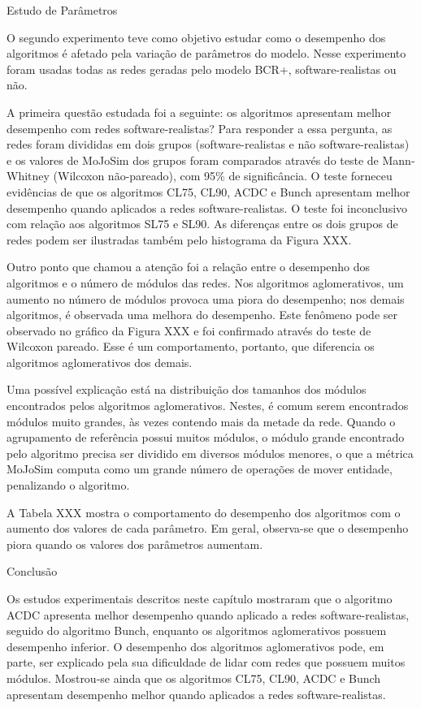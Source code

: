 \begin{section}{Estudo de Parâmetros}

O segundo experimento teve como objetivo estudar como o desempenho dos algoritmos é afetado pela variação de parâmetros do modelo. Nesse experimento foram usadas todas as redes geradas pelo modelo BCR+, software-realistas ou não.

A primeira questão estudada foi a seguinte: os algoritmos apresentam melhor desempenho com redes software-realistas? Para responder a essa pergunta, as redes foram divididas em dois grupos (software-realistas e não software-realistas) e os valores de MoJoSim dos grupos foram comparados através do teste de Mann-Whitney (Wilcoxon não-pareado), com 95\% de significância. O teste forneceu evidências de que os algoritmos CL75, CL90, ACDC e Bunch apresentam melhor desempenho quando aplicados a redes software-realistas. O teste foi inconclusivo com relação aos algoritmos SL75 e SL90. As diferenças entre os dois grupos de redes podem ser ilustradas também pelo histograma da Figura XXX.

Outro ponto que chamou a atenção foi a relação entre o desempenho dos algoritmos e o número de módulos das redes. Nos algoritmos aglomerativos, um aumento no número de módulos provoca uma piora do desempenho; nos demais algoritmos, é observada uma melhora do desempenho. Este fenômeno pode ser observado no gráfico da Figura XXX e foi confirmado através do teste de Wilcoxon pareado. Esse é um comportamento, portanto, que diferencia os algoritmos aglomerativos dos demais. 

Uma possível explicação está na distribuição dos tamanhos dos módulos encontrados pelos algoritmos aglomerativos. Nestes, é comum serem encontrados módulos muito grandes, às vezes contendo mais da metade da rede. Quando o agrupamento de referência possui muitos módulos, o módulo grande encontrado pelo algoritmo precisa ser dividido em diversos módulos menores, o que a métrica MoJoSim computa como um grande número de operações de mover entidade, penalizando o algoritmo.

A Tabela XXX mostra o comportamento do desempenho dos algoritmos com o aumento dos valores de cada parâmetro. Em geral, observa-se que o desempenho piora quando os valores dos parâmetros aumentam.

\end{section}

\begin{section}{Conclusão}

Os estudos experimentais descritos neste capítulo mostraram que o algoritmo ACDC apresenta melhor desempenho quando aplicado a redes software-realistas, seguido do algoritmo Bunch, enquanto os algoritmos aglomerativos possuem desempenho inferior. O desempenho dos algoritmos aglomerativos pode, em parte, ser explicado pela sua dificuldade de lidar com redes que possuem muitos módulos. Mostrou-se ainda que os algoritmos CL75, CL90, ACDC e Bunch apresentam desempenho melhor quando aplicados a redes software-realistas.

\end{section}
